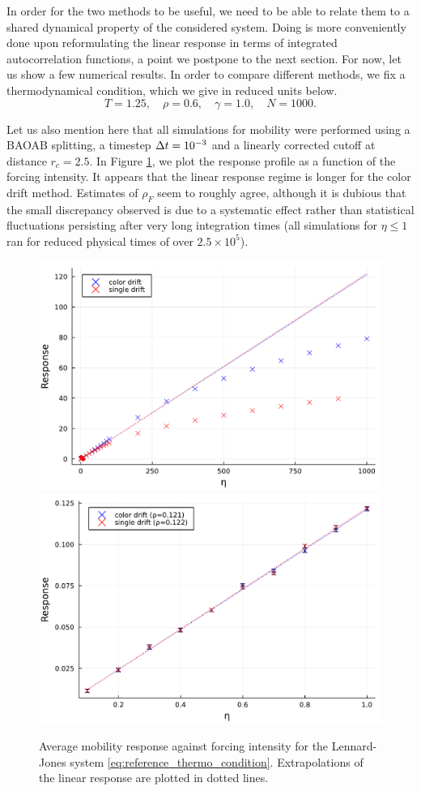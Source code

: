 In order for the two methods to be useful, we need to be able to relate them to a shared dynamical property of the considered system.
Doing is more conveniently done upon reformulating the linear response in terms of integrated autocorrelation functions, a point we postpone to the next section.
For now, let us show a few numerical results.
In order to compare different methods, we fix a thermodynamical condition, which we give in reduced units below.
\begin{equation}
    \label{eq:reference_thermo_condition}
    T=1.25,\quad \rho=0.6,\quad \gamma=1.0,\quad N=1000.
\end{equation}

Let us also mention here that all simulations for mobility were performed using a BAOAB splitting, a timestep ${\Delta t}=10^{-3}$ and a linearly corrected cutoff at distance $r_c=2.5$.
In Figure \ref{fig:nemd_mobility_full}, we plot the response profile as a function of the forcing intensity. 
It appears that the linear response regime is longer for the color drift method.
Estimates of $\rho_F$ seem to roughly agree, although it is dubious that the small discrepancy observed is due to a systematic effect rather than statistical fluctuations persisting after very long integration times (all simulations for $\eta\leq 1$ ran for reduced physical times of over $2.5 \times 10^5$).
\begin{figure}[htbp]
    \begin{center}
      \includegraphics[width=0.7\linewidth]{figures/nemd/nemd_mobility_full.pdf}
      \includegraphics[width=0.7\linewidth]{figures/nemd/nemd_mobility_linear.pdf}
      \caption{ \label{fig:nemd_mobility_full}
        Average mobility response against forcing intensity for the Lennard-Jones system \eqref{eq:reference_thermo_condition}. Extrapolations of the linear response are plotted in dotted lines.
      }
    \end{center}
  \end{figure}


